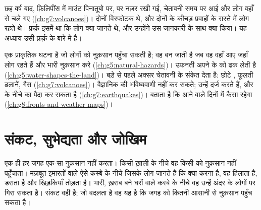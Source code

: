 छह वर्ष बाद, फ़िलिपींस में माउंट पिनातूबो पर,  पर नज़र रखी गई, चेतावनी समय पर
आई और लोग वहाँ से चले गए (\cref{ch:g7:volcanoes})। दोनों विस्फोटक  थे, और
दोनों के कीचड़ प्रवाहों के रास्ते में लोग रहते थे। फ़र्क़ इसमें था कि लोग क्या जानते थे,
और उन्होंने उस जानकारी के साथ क्या किया। यह अध्याय उसी फ़र्क़ के बारे में
है।

\begin{recall}
\emph{} एक प्राकृतिक घटना है जो लोगों को नुक़सान पहुँचा सकती है; वह
\emph{} बन जाती है जब वह वहाँ आए जहाँ लोग रहते हैं और भारी नुक़सान
करे (\cref{ch:g5:natural-hazards})। उफनती  अपने  के  को ढक लेती है
(\cref{ch:g5:water-shapes-the-land})। बड़े  से पहले  अक्सर चेतावनी के
संकेत देता है: छोटे , फूलती ढलानें, गैस (\cref{ch:g7:volcanoes})। वैज्ञानिक
 की भविष्यवाणी नहीं कर सकते;  उन्हें दर्ज करते हैं, और  के नीचे का
  पैदा कर सकता है (\cref{ch:g7:earthquakes})।  बताता है कि
आने वाले दिनों में  कैसा रहेगा
(\cref{ch:g8:fronts-and-weather-maps})।
\end{recall}

\section{संकट, सुभेद्यता और जोखिम}

एक ही  हर जगह एक-सा नुक़सान नहीं करता। किसी ख़ाली  के नीचे वह किसी को
नुक़सान नहीं पहुँचाता। मज़बूत इमारतों वाले ऐसे कस्बे के नीचे जिसके लोग जानते हैं कि क्या
करना है, वह हिलाता है, डराता है और खिड़कियाँ तोड़ता है। भारी, ख़राब बने घरों वाले कस्बे के
नीचे वह उन्हें अंदर के लोगों पर गिरा सकता है। संकट वही है; जो बदलता है वह यह है कि जगह
को कितनी आसानी से नुक़सान पहुँच सकता
है।

